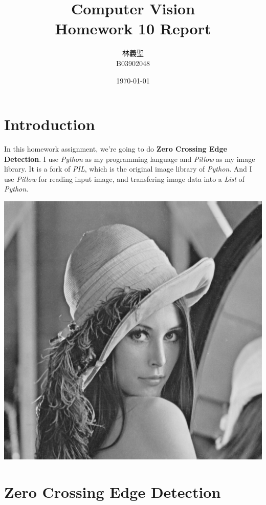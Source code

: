 \documentclass[10pt,a4paper]{article}
\title{{\optima Computer Vision\\Homework 10 Report}}
\author{林義聖\\B03902048}
\date{\today}
\newenvironment{Figure}
  {\par\medskip\noindent\minipage{\linewidth}}
  {\endminipage\par\medskip}
\begin{document}
\maketitle
\thispagestyle{fancy}

\begin{multicols}{2}

\section{Introduction}

In this homework assignment, we're going to do \textbf{Zero Crossing Edge Detection}. I use \textit{Python} as my programming language and \textit{Pillow} as my image library. It is a fork of \textit{PIL}, which is the original image library of \textit{Python}. And I use \textit{Pillow} for reading input image, and transfering image data into a \textit{List} of \textit{Python}.

\begin{Figure}
\centering
\includegraphics[scale=0.3]{lena.bmp}
\label{fig:lena.bmp}
\end{Figure}

\section{Zero Crossing Edge Detection}


\end{multicols}
\end{document}
